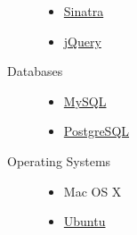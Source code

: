 \documentclass[a4paper,10pt]{article}
\begin{document}
\begin{description}
\begin{itemize}
      \item \href{http://www.sinatrarb.com}{Sinatra}
      \item \href{http://jquery.com}{jQuery}
    \end{itemize}
  \item[Databases] \hfill
    \begin{itemize}
      \item \href{http://www.mysql.com}{MySQL}
      \item \href{http://www.postgresql.org}{PostgreSQL}
    \end{itemize}
  \item[Operating Systems] \hfill
    \begin{itemize}
      \item Mac OS X
      \item \href{http://www.ubuntu.com}{Ubuntu}
    \end{itemize}
\end{description}

\end{document}
